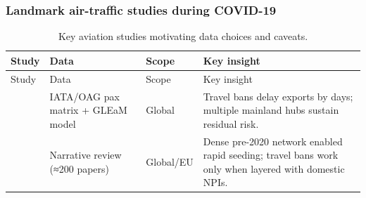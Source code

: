 \documentclass[
  authoryear,
  preprint,
  3p,
  onecolumn]{elsarticle}
\begin{document}
\clearpage

\subsubsection{Landmark air-traffic studies during
COVID-19}\label{landmark-air-traffic-studies-during-covid-19}

\begin{longtable}[]{@{}
  >{\raggedright\arraybackslash}p{}
  >{\raggedright\arraybackslash}p{}
  >{\raggedright\arraybackslash}p{}
  >{\raggedright\arraybackslash}p{}@{}}
\caption{Key aviation studies motivating data choices and
caveats.}\label{tbl-studies}\tabularnewline
\toprule\noalign{}
\begin{minipage}[b]{\linewidth}\raggedright
Study
\end{minipage} & \begin{minipage}[b]{\linewidth}\raggedright
Data
\end{minipage} & \begin{minipage}[b]{\linewidth}\raggedright
Scope
\end{minipage} & \begin{minipage}[b]{\linewidth}\raggedright
Key insight
\end{minipage} \\
\midrule\noalign{}
\endfirsthead
\toprule\noalign{}
\begin{minipage}[b]{\linewidth}\raggedright
Study
\end{minipage} & \begin{minipage}[b]{\linewidth}\raggedright
Data
\end{minipage} & \begin{minipage}[b]{\linewidth}\raggedright
Scope
\end{minipage} & \begin{minipage}[b]{\linewidth}\raggedright
Key insight
\end{minipage} \\
\midrule\noalign{}
\endhead
\bottomrule\noalign{}
\endlastfoot
\citet{chinazzi2020} & IATA/OAG pax matrix + GLEaM model & Global &
Travel bans delay exports by days; multiple mainland hubs sustain
residual risk. \\
\citet{sun2022_a} & Narrative review (≈200 papers) & Global/EU & Dense
pre-2020 network enabled rapid seeding; travel bans work only when
layered with domestic NPIs. \\

\end{longtable}
\end{document}

